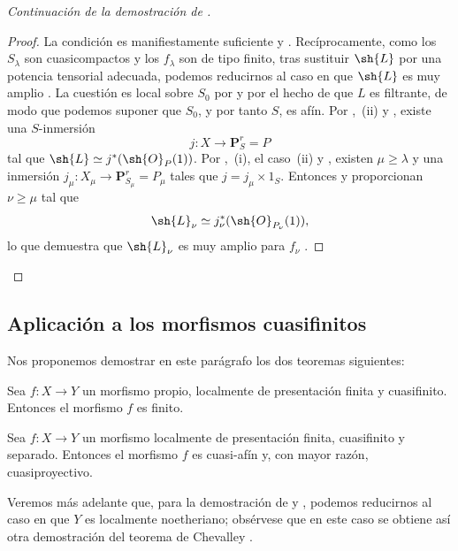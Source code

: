 \begin{proof}[Continuación de la demostración de ]
\begin{proof}
La condición es manifiestamente suficiente  y . Recíprocamente, como los $S_\lambda$ son cuasicompactos y los $f_\lambda$ son de tipo finito, tras sustituir $\sh{L}$ por una potencia tensorial adecuada, podemos reducirnos al caso en que $\sh{L}$ es muy amplio . La cuestión es local sobre $S_0$ por  y por el hecho de que $L$ es filtrante, de modo que podemos suponer que $S_0$, y por tanto $S$, es afín. Por ,~(ii) y , existe una $S$-inmersión
\[
  j:X\longrightarrow\mathbf{P}^r_S=P
\]
tal que $\sh{L}\simeq j^*(\sh{O}_P(1))$. Por ,~(i), el caso~(ii) y , existen $\mu\geqslant\lambda$ y una inmersión $j_\mu:X_\mu\to\mathbf{P}^r_{S_\mu}=P_\mu$ tales que $j=j_\mu\times1_S$. Entonces  y  proporcionan $\nu\geqslant\mu$ tal que
\[
  \sh{L}_\nu\simeq j_\nu^*(\sh{O}_{P_\nu}(1)),
\]
lo que demuestra que $\sh{L}_\nu$ es muy amplio para $f_\nu$ .
\end{proof}
\end{proof}

\subsection{Aplicación a los morfismos cuasifinitos}
\label{subsection:IV.8.11}
\label{IV.8.11}

Nos proponemos demostrar en este parágrafo los dos teoremas siguientes:

\begin{theorem}[8.11.1]
\label{IV.8.11.1}
Sea $f:X\to Y$ un morfismo propio, localmente de presentación finita y cuasifinito.
Entonces el morfismo $f$ es finito.
\end{theorem}

\begin{theorem}[8.11.2]
\label{IV.8.11.2}
Sea $f:X\to Y$ un morfismo localmente de presentación finita, cuasifinito y separado.
Entonces el morfismo $f$ es cuasi-afín y, con mayor razón, cuasiproyectivo.
\end{theorem}

\begin{remark}[8.11.3]
\label{IV.8.11.3}
Veremos más adelante que, para la demostración de  y , podemos reducirnos al caso en que $Y$ es localmente noetheriano; obsérvese que en este caso se obtiene así otra demostración del teorema de Chevalley .
\end{remark}

